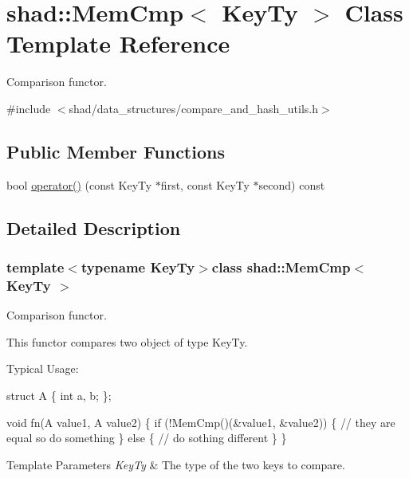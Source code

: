 \hypertarget{classshad_1_1MemCmp}{\section{shad\-:\-:Mem\-Cmp$<$ Key\-Ty $>$ Class Template Reference}
\label{classshad_1_1MemCmp}
}


Comparison functor.  




{\ttfamily \#include $<$shad/data\-\_\-structures/compare\-\_\-and\-\_\-hash\-\_\-utils.\-h$>$}

\subsection*{Public Member Functions}
\begin{DoxyCompactItemize}
\item 
bool \hyperlink{classshad_1_1MemCmp_aab48de1966a6e2056bcb9aa6232707b0}{operator()} (const Key\-Ty $\ast$first, const Key\-Ty $\ast$second) const 
\end{DoxyCompactItemize}


\subsection{Detailed Description}
\subsubsection*{template$<$typename Key\-Ty$>$class shad\-::\-Mem\-Cmp$<$ Key\-Ty $>$}

Comparison functor. 

This functor compares two object of type Key\-Ty.

Typical Usage\-: 
\begin{DoxyCode}
\textcolor{keyword}{struct }A \{
  \textcolor{keywordtype}{int} a, b;
\};

\textcolor{keywordtype}{void} fn(A value1, A value2) \{
  \textcolor{keywordflow}{if} (!MemCmp()(&value1, &value2)) \{
    \textcolor{comment}{// they are equal so do something}
  \} \textcolor{keywordflow}{else} \{
    \textcolor{comment}{// do sothing different}
  \}
\}
\end{DoxyCode}



\begin{DoxyTemplParams}{Template Parameters}
{\em Key\-Ty} & The type of the two keys to compare.\\
\hline
\end{DoxyTemplParams}


